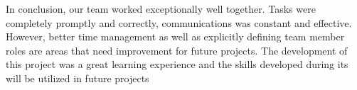 \documentclass{article}
\begin{document}
In conclusion, our team worked exceptionally well together. Tasks were completely promptly and correctly, communications was constant and effective. However, better time management as well as explicitly defining team member roles are areas that need improvement for future projects. The development of this project was a great learning experience and the skills developed during its will be utilized in future projects
	
\end{document}
